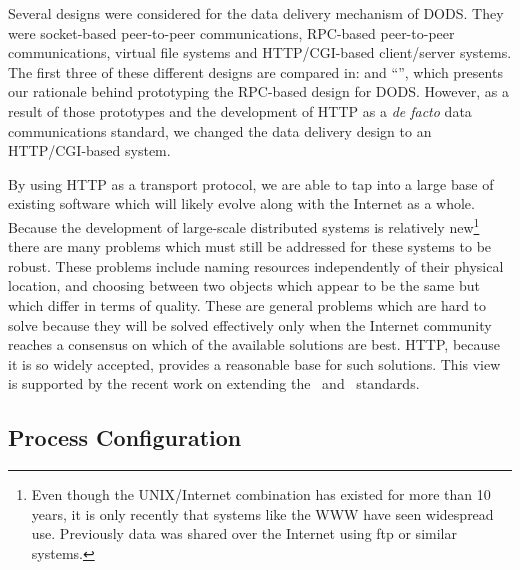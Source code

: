 Several designs were considered for the data delivery mechanism of DODS\@.
They were socket-based peer-to-peer communications, RPC-based peer-to-peer
communications, virtual file systems and HTTP/CGI-based client/server
systems. The first three of these different designs are compared in: \wrkshp
and ``\DD'', which presents our rationale behind prototyping the RPC-based
design for DODS\@. However, as a result of those prototypes and the development
of HTTP as a {\em de facto\/} data communications standard, we changed the
data delivery design to an HTTP/CGI-based system.

By using HTTP as a transport protocol, we are able to tap into a large base
of existing software which will likely evolve along with the Internet as a
whole. Because the development of large-scale distributed systems is
relatively new\footnote{Even though the UNIX/Internet combination has existed
for more than 10 years, it is only recently that systems like the WWW have
seen widespread use. Previously data was shared over the Internet using ftp
or similar systems.} there are many problems which must still be addressed
for these systems to be robust. These problems include naming resources
independently of their physical location, and choosing between two objects
which appear to be the same but which differ in terms of quality. These are
general problems which are hard to solve because they will be solved
effectively only when the Internet community reaches a consensus on which of
the available solutions are best. HTTP, because it is so widely accepted,
provides a reasonable base for such solutions. This view is supported by the
recent  work on extending the
\HTTP\ and \HTML\ standards.

\subsection{Process Configuration}
\label{ddd:process-config}

